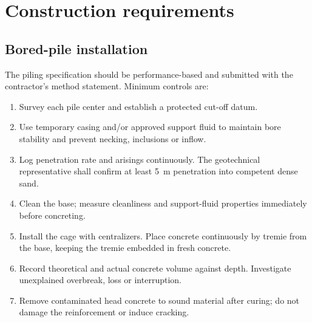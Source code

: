 \section{Construction requirements}
\subsection{Bored-pile installation}
The piling specification should be performance-based and submitted with the contractor's method
statement. Minimum controls are:
\begin{enumerate}
  \item Survey each pile center and establish a protected cut-off datum.
  \item Use temporary casing and/or approved support fluid to maintain bore stability and prevent
        necking, inclusions or inflow.
  \item Log penetration rate and arisings continuously. The geotechnical representative shall
        confirm at least \SI{5}{\metre} penetration into competent dense sand.
  \item Clean the base; measure cleanliness and support-fluid properties immediately before
        concreting.
  \item Install the cage with centralizers. Place concrete continuously by tremie from the base,
        keeping the tremie embedded in fresh concrete.
  \item Record theoretical and actual concrete volume against depth. Investigate unexplained
        overbreak, loss or interruption.
  \item Remove contaminated head concrete to sound material after curing; do not damage the
        reinforcement or induce cracking.
\end{enumerate}


